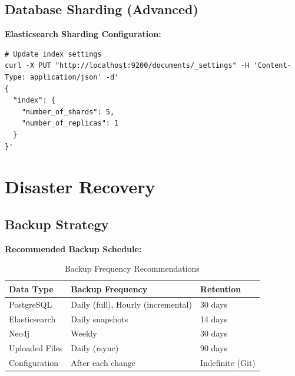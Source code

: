 \subsection{Database Sharding (Advanced)}

\textbf{Elasticsearch Sharding Configuration:}
\begin{commandbox}
\begin{lstlisting}[style=bashstyle]
# Update index settings
curl -X PUT "http://localhost:9200/documents/_settings" -H 'Content-Type: application/json' -d'
{
  "index": {
    "number_of_shards": 5,
    "number_of_replicas": 1
  }
}'
\end{lstlisting}
\end{commandbox}

\section{Disaster Recovery}

\subsection{Backup Strategy}

\textbf{Recommended Backup Schedule:}
\begin{table}[h]
\centering
\caption{Backup Frequency Recommendations}
\begin{tabularx}{\textwidth}{lXl}
\toprule
\textbf{Data Type} & \textbf{Backup Frequency} & \textbf{Retention} \\
\midrule
PostgreSQL & Daily (full), Hourly (incremental) & 30 days \\
Elasticsearch & Daily snapshots & 14 days \\
Neo4j & Weekly & 30 days \\
Uploaded Files & Daily (rsync) & 90 days \\
Configuration & After each change & Indefinite (Git) \\
\bottomrule
\end{tabularx}
\end{table}

